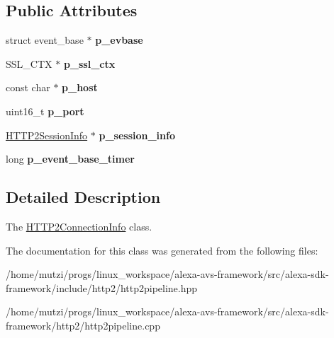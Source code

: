 \subsection*{Public Attributes}
\begin{DoxyCompactItemize}
\item 
\mbox{\label{classhttp2_1_1HTTP2ConnectionInfo_a9fb3afdd9a7d3f415520955737f86eb3}} 
struct event\+\_\+base $\ast$ {\bfseries p\+\_\+evbase}
\item 
\mbox{\label{classhttp2_1_1HTTP2ConnectionInfo_a777fd1c96eaf3be7e86c0e3ea551cd51}} 
S\+S\+L\+\_\+\+C\+TX $\ast$ {\bfseries p\+\_\+ssl\+\_\+ctx}
\item 
\mbox{\label{classhttp2_1_1HTTP2ConnectionInfo_a8d383f1398e822a90884ba0e3e11c405}} 
const char $\ast$ {\bfseries p\+\_\+host}
\item 
\mbox{\label{classhttp2_1_1HTTP2ConnectionInfo_a7515f79a709fa4da9d5aa36bf57ab664}} 
uint16\+\_\+t {\bfseries p\+\_\+port}
\item 
\mbox{\label{classhttp2_1_1HTTP2ConnectionInfo_aba20083181f0f98bb9a7cffd00ed4350}} 
\hyperlink{classhttp2_1_1HTTP2SessionInfo}{H\+T\+T\+P2\+Session\+Info} $\ast$ {\bfseries p\+\_\+session\+\_\+info}
\item 
\mbox{\label{classhttp2_1_1HTTP2ConnectionInfo_aa00980e7d82ec2760ebbe5e607312771}} 
long {\bfseries p\+\_\+event\+\_\+base\+\_\+timer}
\end{DoxyCompactItemize}


\subsection{Detailed Description}
The \hyperlink{classhttp2_1_1HTTP2ConnectionInfo}{H\+T\+T\+P2\+Connection\+Info} class. 

The documentation for this class was generated from the following files\+:\begin{DoxyCompactItemize}
\item 
/home/mutzi/progs/linux\+\_\+workspace/alexa-\/avs-\/framework/src/alexa-\/sdk-\/framework/include/http2/http2pipeline.\+hpp\item 
/home/mutzi/progs/linux\+\_\+workspace/alexa-\/avs-\/framework/src/alexa-\/sdk-\/framework/http2/http2pipeline.\+cpp\end{DoxyCompactItemize}
